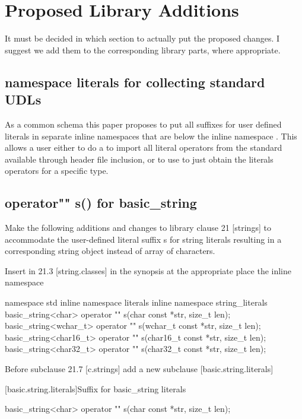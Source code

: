 \documentclass[ebook,11pt,article]{memoir}
\begin{document}
\chapter{Proposed Library Additions}
It must be decided in which section to actually put the proposed changes. I suggest we add them to the corresponding library parts, where appropriate.
\section{namespace literals for collecting standard UDLs}
As a common schema this paper proposes to put all suffixes for user defined literals in separate inline namespaces that are below the inline namespace . 
\enternote
This allows a user either to do a  to import all literal operators from the standard available through header file inclusion, or to use  to just obtain the literals operators for a specific type.
\exitnote



\section{operator"" s() for basic_string}
Make the following additions and changes to library clause 21 [strings] to accommodate the user-defined literal suffix s for string literals resulting in a corresponding string object instead of array of characters.

Insert in 21.3 [string.classes] in the synopsis at the appropriate place the inline namespace 
\begin{codeblock}
namespace std{
inline namespace literals{
inline namespace string_literals{
basic_string<char> operator "" s(char const *str, size_t len);
basic_string<wchar_t> operator "" s(wchar_t const *str, size_t len);
basic_string<char16_t> operator "" s(char16_t const *str, size_t len);
basic_string<char32_t> operator "" s(char32_t const *str, size_t len);
}}}
\end{codeblock}

Before subclause 21.7 [c.strings] add a new subclause [basic.string.literals]

[basic.string.literals]{Suffix for basic_string literals}
\begin{itemdecl}
basic_string<char> operator "" s(char const *str, size_t len);
\end{itemdecl}
\end{document}
